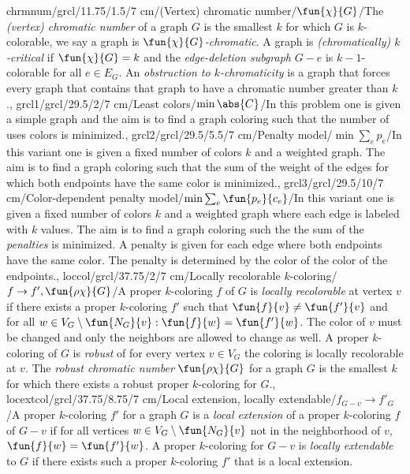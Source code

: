 chrmnum/grcl/11.75/1.5/7 cm/{(Vertex) chromatic number}/{$\fun{\chi}{G}$}/{The \emph{(vertex) chromatic number} of a graph $G$ is the smallest $k$ for which $G$ is $k$-colorable, we say a graph is \emph{$\fun{\chi}{G}$-chromatic}. A graph is \emph{(chromatically) $k$-critical} if $\fun{\chi}{G}=k$ and the \emph{edge-deletion subgraph} $G-e$ is $k-1$-colorable for all $e\in E_G$. An \emph{obstruction to $k$-chromaticity} is a graph that forces every graph that contains that graph to have a chromatic number greater than $k$.},
grcl1/grcl/29.5/2/7 cm/{Least colors}/{$\min\abs{C}$}/{In this problem one is given a simple graph and the aim is to find a graph coloring such that the number of uses colors is minimized.},
grcl2/grcl/29.5/5.5/7 cm/{Penalty model}/{$\min\sum_e p_e$}/{In this variant one is given a fixed number of colors $k$ and a weighted graph. The aim is to find a graph coloring such that the sum of the weight of the edges for which both endpoints have the same color is minimized.},
grcl3/grcl/29.5/10/7 cm/{Color-dependent penalty model}/{$\min\sum_e\fun{p_e}{c_e}$}/{In this variant one is given a fixed number of colors $k$ and a weighted graph where each edge is labeled with $k$ values. The aim is to find a graph coloring such the the sum of the \emph{penalties} is minimized. A penalty is given for each edge where both endpoints have the same color. The penalty is determined by the color of the color of the endpoints.},
loccol/grcl/37.75/2/7 cm/{Locally recolorable $k$-coloring}/{$f\rightarrow f',\fun{\rho\chi}{G}$}/{A proper $k$-coloring $f$ of $G$ is \emph{locally recolorable} at vertex $v$ if there exists a proper $k$-coloring $f'$ such that $\fun{f}{v}\neq\fun{f'}{v}$ and for all $w\in V_G\setminus\fun{N_G}{v}:\fun{f}{w}=\fun{f'}{w}$. The color of $v$ must be changed and only the neighbors are allowed to change as well. A proper $k$-coloring of $G$ is \emph{robust} of for every vertex $v\in V_G$ the coloring is locally recolorable at $v$. The \emph{robust chromatic number} $\fun{\rho\chi}{G}$ for a graph $G$ is the smallest $k$ for which there exists a robust proper $k$-coloring for $G$.},
locextcol/grcl/37.75/8.75/7 cm/{Local extension, locally extendable}/{$f_{G-v}\rightarrow f'_{G}$}/{A proper $k$-coloring $f'$ for a graph $G$ is a \emph{local extension} of a proper $k$-coloring $f$ of $G-v$ if for all vertices $w\in V_G\setminus\fun{N_G}{v}$ not in the neighborhood of $v$, $\fun{f}{w}=\fun{f'}{w}$. A proper $k$-coloring for $G-v$ is \emph{locally extendable} to $G$ if there exists such a proper $k$-coloring $f'$ that is a local extension.}